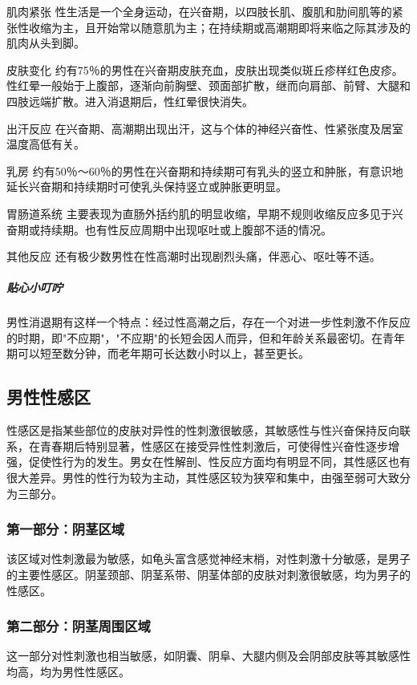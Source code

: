 肌肉紧张
性生活是一个全身运动，在兴奋期，以四肢长肌、腹肌和肋间肌等的紧张性收缩为主，且开始常以随意肌为主；在持续期或高潮期即将来临之际其涉及的肌肉从头到脚。

皮肤变化
约有75％的男性在兴奋期皮肤充血，皮肤出现类似斑丘疹样红色皮疹。性红晕一般始于上腹部，逐渐向前胸壁、颈面部扩散，继而向肩部、前臂、大腿和四肢远端扩散。进入消退期后，性红晕很快消失。

出汗反应
在兴奋期、高潮期出现出汗，这与个体的神经兴奋性、性紧张度及居室温度高低有关。

乳房
约有50％～60％的男性在兴奋期和持续期可有乳头的竖立和肿胀，有意识地延长兴奋期和持续期时可使乳头保持竖立或肿胀更明显。

胃肠道系统
主要表现为直肠外括约肌的明显收缩，早期不规则收缩反应多见于兴奋期或持续期。也有性反应周期中出现呕吐或上腹部不适的情况。

其他反应
还有极少数男性在性高潮时出现剧烈头痛，伴恶心、呕吐等不适。

\subparagraph{贴心小叮咛}

男性消退期有这样一个特点：经过性高潮之后，存在一个对进一步性刺激不作反应的时期，即"不应期"，"不应期"的长短会因人而异，但和年龄关系最密切。在青年期可以短至数分钟，而老年期可长达数小时以上，甚至更长。

\subsection{男性性感区}

性感区是指某些部位的皮肤对异性的性刺激很敏感，其敏感性与性兴奋保持反向联系，在青春期后特别显著，性感区在接受异性性刺激后，可使得性兴奋性逐步增强，促使性行为的发生。男女在性解剖、性反应方面均有明显不同，其性感区也有很大差异。男性的性行为较为主动，其性感区较为狭窄和集中，由强至弱可大致分为三部分。

\subsubsection{第一部分：阴茎区域}

该区域对性刺激最为敏感，如龟头富含感觉神经末梢，对性刺激十分敏感，是男子的主要性感区。阴茎颈部、阴茎系带、阴茎体部的皮肤对刺激很敏感，均为男子的性感区。

\subsubsection{第二部分：阴茎周围区域}

这一部分对性刺激也相当敏感，如阴囊、阴阜、大腿内侧及会阴部皮肤等其敏感性均高，均为男性性感区。

